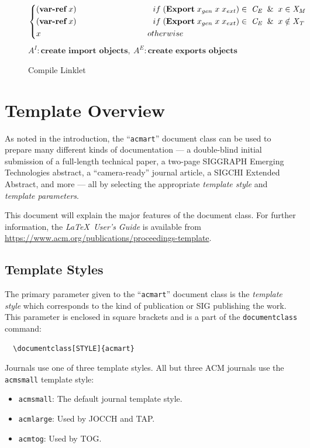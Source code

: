 \documentclass[sigplan,screen,anonymous]{acmart}
\def\dash {\text{-}}
\begin{document}
\begin{figure}[tbp]
\begin{align*}
\begin{cases*}
      (\textbf{var\dash ref}\; x) \hspace{3.3cm} if\; (\textbf{Export}\; x_{gen}\; x\; x_{ext}) \in\;\mathit{C_E}\;\; \&\;\; x\in \mathit{X_M} \\
      (\textbf{var\dash ref}\; x) \hspace{3.3cm} if\; (\textbf{Export}\; x_{gen}\; x\; x_{ext}) \in\;\mathit{C_E}\;\; \&\;\; x\notin \mathit{X_T} \\
      x \hspace{4.6cm} otherwise
    \end{cases*} \\
  \end{align*}
  \hfill \footnotesize $\mathit{A}^I : \textbf{create import objects},\: \mathit{A}^E : \textbf{create exports objects}$
\caption{Compile Linklet}
\label{fig:compile}
\end{figure}


\section{Template Overview}
As noted in the introduction, the ``\verb|acmart|'' document class can be used to prepare many different kinds of documentation --- a double-blind initial submission of a full-length technical paper, a two-page SIGGRAPH Emerging Technologies abstract, a ``camera-ready'' journal article, a SIGCHI Extended Abstract, and more --- all by selecting the appropriate {\it template style} and {\it template parameters}.

This document will explain the major features of the document class. For further information, the {\it \LaTeX\ User's Guide} is available from \url{https://www.acm.org/publications/proceedings-template}.

\subsection{Template Styles}

The primary parameter given to the ``\verb|acmart|'' document class is the {\it template style} which corresponds to the kind of publication or SIG publishing the work. This parameter is enclosed in square brackets and is a part of the {\verb|documentclass|} command:
\begin{verbatim}
  \documentclass[STYLE]{acmart}
\end{verbatim}

Journals use one of three template styles. All but three ACM journals use the {\verb|acmsmall|} template style:
\begin{itemize}
\item {\verb|acmsmall|}: The default journal template style.
\item {\verb|acmlarge|}: Used by JOCCH and TAP.
\item {\verb|acmtog|}: Used by TOG.
\end{itemize}
\end{document}
